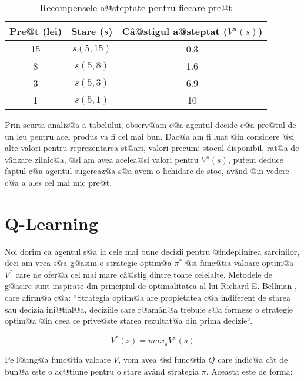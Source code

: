 \begin{table}[h]
	\begin{center}
		\begin{tabular}{|c|c|c|}
			\hline
			Pre@t (lei) & Stare ($s$) & C\^ a@stigul a@steptat ($V^{\pi}(s)$) \\
			\hline
			15 & $s(5,15)$ & 0.3 \\
			\hline
			8 & $s(5,8)$ & 1.6 \\
			\hline
			3 & $s(5,3)$ & 6.9 \\
			\hline
			1 & $s(5,1)$ & 10 \\ 
			\hline
		\end{tabular}
	\end{center}
	\caption{Recompensele a@steptate pentru fiecare pre@t}
	\label{tab:pret-magazin}
\end{table}

Prin scurta analiz@a a tabelului, observ@am c@a agentul decide c@a pre@tul de un leu pentru acel produs va fi cel mai bun. Dac@a am fi luat @in considere @si alte valori pentru reprezentarea st@ari, valori precum: stocul disponibil, rat@a de v\^ anzare zilnic@a, @si am avea acelea@si valori pentru $V^{\pi}(s)$, putem deduce faptul c@a agentul sugereaz@a s@a avem o lichidare de stoc, av\^and @in vedere c@a a ales cel mai mic pre@t.

\section{Q-Learning}

Noi dorim ca agentul s@a ia cele mai bune decizii pentru @indeplinirea sarcinilor, deci am vrea s@a g@asim o strategie optim@a $\pi^*$ @si func@tia valoare optim@a $V^{*}$ care ne ofer@a cel mai mare c\^ a@stig dintre toate celelalte. Metodele de g@asire sunt inspirate din principiul de optimalitatea al lui Richard E. Bellman \cite{bellman-theory}, care afirm@a c@a: ``Strategia optim@a are propietatea c@a indiferent de starea sau decizia ini@tial@a, deciziile care r@am\^ an@a trebuie s@a formeze o strategie optim@a @in ceea ce prive@ste starea rezultat@a din prima decizie``.  

\begin{equation}
	V^{*}(s) = max_{\pi} V^{\pi}(s)
\end{equation}

Pe l@ang@a func@tia valoare $V$, vom avea @si func@tia $Q$ care indic@a c\^ at de bun@a este o ac@tiune pentru o stare av\^and strategia $\pi$. Aceasta este de forma:

